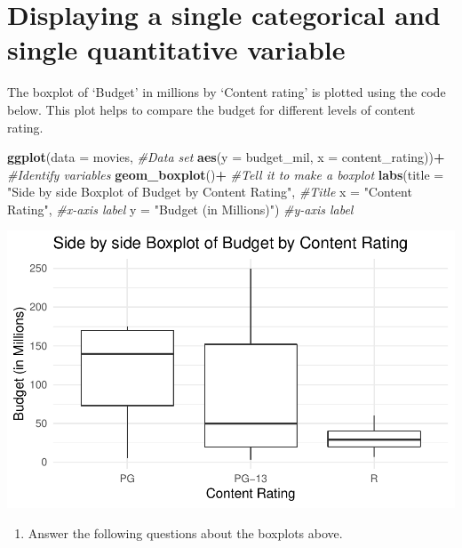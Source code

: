 \documentclass[
]{report}
\newenvironment{Shaded}{\begin{snugshade}}{\end{snugshade}}
\newcommand{\CommentTok}[1]{\textcolor[rgb]{0.56,0.35,0.01}{\textit{#1}}}
\newcommand{\DataTypeTok}[1]{\textcolor[rgb]{0.13,0.29,0.53}{#1}}
\newcommand{\KeywordTok}[1]{\textcolor[rgb]{0.13,0.29,0.53}{\textbf{#1}}}
\newcommand{\NormalTok}[1]{#1}
\newcommand{\OperatorTok}[1]{\textcolor[rgb]{0.81,0.36,0.00}{\textbf{#1}}}
\newcommand{\StringTok}[1]{\textcolor[rgb]{0.31,0.60,0.02}{#1}}
\providecommand{\tightlist}{%
  \setlength{\itemsep}{0pt}\setlength{\parskip}{0pt}}
\begin{document}
\newpage

\hypertarget{displaying-a-single-categorical-and-single-quantitative-variable}{%
\section{Displaying a single categorical and single quantitative variable}\label{displaying-a-single-categorical-and-single-quantitative-variable}}

The boxplot of `Budget' in millions by `Content rating' is plotted using the code below. This plot helps to compare the budget for different levels of content rating.

\begin{Shaded}
\begin{Highlighting}[]
\KeywordTok{ggplot}\NormalTok{(}\DataTypeTok{data =}\NormalTok{ movies,  }\CommentTok{#Data set}
       \KeywordTok{aes}\NormalTok{(}\DataTypeTok{y =}\NormalTok{ budget_mil, }\DataTypeTok{x =}\NormalTok{ content_rating))}\OperatorTok{+}\StringTok{  }\CommentTok{#Identify variables}
\StringTok{  }\KeywordTok{geom_boxplot}\NormalTok{()}\OperatorTok{+}\StringTok{  }\CommentTok{#Tell it to make a boxplot}
\StringTok{  }\KeywordTok{labs}\NormalTok{(}\DataTypeTok{title =} \StringTok{"Side by side Boxplot of Budget by Content Rating"}\NormalTok{,  }\CommentTok{#Title}
        \DataTypeTok{x =} \StringTok{"Content Rating"}\NormalTok{,    }\CommentTok{#x-axis label}
       \DataTypeTok{y =} \StringTok{"Budget (in Millions)"}\NormalTok{)  }\CommentTok{#y-axis label}
\end{Highlighting}
\end{Shaded}

\begin{center}\includegraphics[width=0.6\linewidth]{04-EDA-quantitative_files/figure-latex/unnamed-chunk-4-1} \end{center}

\begin{enumerate}
\def\labelenumi{\arabic{enumi}.}
\setcounter{enumi}{10}
\tightlist
\item
  Answer the following questions about the boxplots above.
\end{enumerate}
\end{document}
